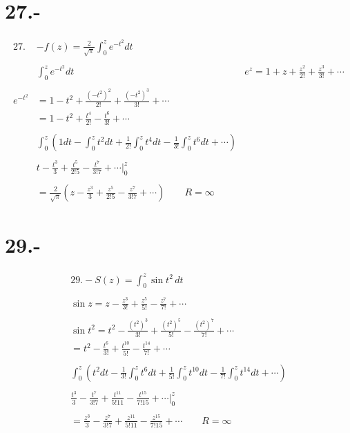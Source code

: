 \documentclass{article}
\begin{document}
\section*{27.- }
\begin{align*}
27. &- f(z) = \frac{2}{\sqrt{\pi}} \int_0^z e^{-t^2} dt & \\
\\
& \int_0^z e^{-t^2} dt & e^z = 1 + z + \frac{z^2}{2!} + \frac{z^3}{3!} + \dotsb \\
\\
e^{-t^2} &= 1 - t^2 + \frac{(-t^2)^2}{2!} + \frac{(-t^2)^3}{3!} + \dotsb \\
&= 1 - t^2 + \frac{t^4}{2!} - \frac{t^6}{3!} + \dotsb \\
\\
&\int_0^z \left( 1 dt - \int_0^z t^2 dt + \frac{1}{2!} \int_0^z t^4 dt - \frac{1}{3!} \int_0^z t^6 dt + \dotsb \right) \\
\\
& t - \frac{t^3}{3} + \frac{t^5}{2!5} - \frac{t^7}{3!7} + \dotsb \Bigg|_0^z \\
\\
&= \frac{2}{\sqrt{\pi}} \left( z - \frac{z^3}{3} + \frac{z^5}{2!5} - \frac{z^7}{3!7} + \dotsb \right) \qquad R = \infty
\end{align*}
\section*{29.- }
\begin{align*}
& 29.- S(z) = \int_0^z \sin t^2 \, dt & \\
\\
& \sin z = z - \frac{z^3}{3!} + \frac{z^5}{5!} - \frac{z^7}{7!} + \dotsb & \\
\\
& \sin t^2 = t^2 - \frac{(t^2)^3}{3!} + \frac{(t^2)^5}{5!} - \frac{(t^2)^7}{7!} + \dotsb \\
&= t^2 - \frac{t^6}{3!} + \frac{t^{10}}{5!} - \frac{t^{14}}{7!} + \dotsb \\
\\
& \int_0^z \left( t^2 dt - \frac{1}{3!} \int_0^z t^6 dt + \frac{1}{5!} \int_0^z t^{10} dt - \frac{1}{7!} \int_0^z t^{14} dt + \dotsb \right) \\
\\
& \frac{t^3}{3} - \frac{t^7}{3!7} + \frac{t^{11}}{5!11} - \frac{t^{15}}{7!15} + \dotsb \Bigg|_0^z \\
\\
&= \frac{z^3}{3} - \frac{z^7}{3!7} + \frac{z^{11}}{5!11} - \frac{z^{15}}{7!15} + \dotsb \qquad R = \infty
\end{align*}
\end{document}
